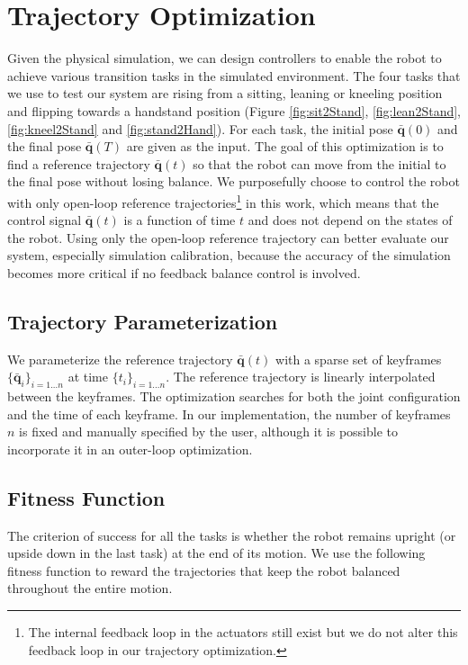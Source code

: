 \section{Trajectory Optimization}

Given the physical simulation, we can design controllers to enable the robot to achieve various transition tasks in the simulated environment. The four tasks that we use to test our system are rising from a sitting, leaning or kneeling position and flipping towards a handstand position (Figure \ref{fig:sit2Stand}, \ref{fig:lean2Stand}, \ref{fig:kneel2Stand} and \ref{fig:stand2Hand}). For each task, the initial pose $\bar{\mathbf{q}}(0)$ and the final pose $\bar{\mathbf{q}}(T)$ are given as the input. The goal of this optimization is to find a reference trajectory $\bar{\mathbf{q}}(t)$ so that the robot can move from the initial to the final pose without losing balance. We purposefully choose to control the robot with only open-loop reference trajectories\footnote{The internal feedback loop in the actuators still exist but we do not alter this feedback loop in our trajectory optimization.} in this work, which means that the control signal $\bar{\mathbf{q}}(t)$ is a function of time $t$ and does not depend on the states of the robot. Using only the open-loop reference trajectory can better evaluate our system, especially simulation calibration, because the accuracy of the simulation becomes more critical if no feedback balance control is involved.

\subsection{Trajectory Parameterization}
We parameterize the reference trajectory $\bar{\mathbf{q}}(t)$ with a sparse set of keyframes $\{\bar{\mathbf{q}}_i\}_{i=1...n}$ at time $\{t_i\}_{i=1...n}$. The reference trajectory is linearly interpolated between the keyframes. The optimization searches for both the joint configuration and the time of each keyframe. In our implementation, the number of keyframes $n$ is fixed and manually specified by the user, although it is possible to incorporate it in an outer-loop optimization.


\subsection{Fitness Function}
The criterion of success for all the tasks is whether the robot remains upright (or upside down in the last task) at the end of its motion. We use the following fitness function to reward the trajectories that keep the robot balanced throughout the entire motion.

